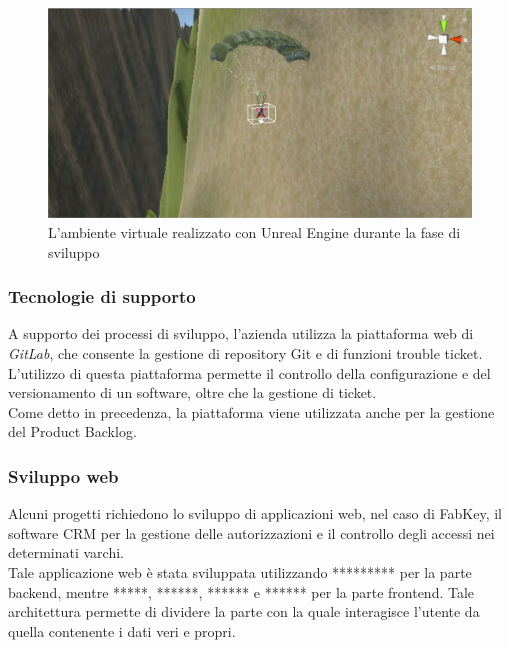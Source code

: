 \begin{figure}[H]
	\begin{center}
	\includegraphics[scale=0.22]{immagini/unity.png}
	\caption{L'ambiente virtuale realizzato con Unreal Engine durante la fase di sviluppo}
	\end{center}
\end{figure}

\subsubsection{Tecnologie di supporto}
A supporto dei processi di sviluppo, l'azienda utilizza la piattaforma web di \textit{GitLab}, che consente la gestione di repository Git e di funzioni trouble ticket.\\
L'utilizzo di questa piattaforma permette il controllo della configurazione e del versionamento di un software, oltre che la gestione di ticket.\\
Come detto in precedenza, la piattaforma viene utilizzata anche per la gestione del Product Backlog.

\subsubsection{Sviluppo web}
Alcuni progetti richiedono lo sviluppo di applicazioni web, nel caso di FabKey, il software CRM per la gestione delle autorizzazioni e il controllo degli accessi nei determinati varchi.\\
Tale applicazione web è stata sviluppata utilizzando ********* per la parte backend, mentre *****, ******, ****** e ****** per la parte frontend.
Tale architettura permette di dividere la parte con la quale interagisce l'utente da quella contenente i dati veri e propri.

